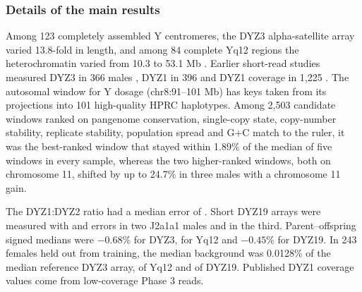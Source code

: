 \subsubsection{Details of the main results}\label{sec:res-main}
Among 123 completely assembled Y centromeres, the DYZ3 alpha-satellite array varied 13.8-fold in length, and among 84 complete Yq12 regions the heterochromatin varied from 10.3 to 53.1 Mb \cite{Hallast2026}. Earlier short-read studies measured DYZ3 in 366 males \cite{Miga2014}, DYZ1 in 396 \cite{Altemose2014} and DYZ1 coverage in 1,225 \cite{SanRoman2024}. The autosomal window for Y dosage (chr8:91--101 Mb) has keys taken from its projections into 101 high-quality HPRC haplotypes. Among 2,503 candidate windows ranked on pangenome conservation, single-copy state, copy-number stability, replicate stability, population spread and G+C match to the ruler, it was the best-ranked window that stayed within 1.89\% of the median of five windows in every sample, whereas the two higher-ranked windows, both on chromosome 11, shifted by up to 24.7\% in three males with a chromosome 11 gain.

The DYZ1:DYZ2 ratio had a median error of . Short DYZ19 arrays were measured with  and  errors in two J2a1a1 males and  in the third. Parent--offspring signed medians were $-0.68\%$ for DYZ3,  for Yq12 and $-0.45\%$ for DYZ19. In 243 females held out from training, the median background was 0.0128\% of the median reference DYZ3 array,  of Yq12 and  of DYZ19. Published DYZ1 coverage values \cite{SanRoman2024} come from low-coverage Phase 3 reads. 

